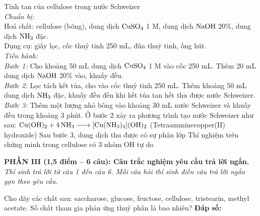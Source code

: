 \documentclass[12pt,a4paper]{article}
\providecommand{\False}{}
\begin{document}
\begin{ex}
Tính tan của cellulose trong nước Schweizer\\
\textit{Chuẩn bị:}\\
Hoá chất: cellulose (bông), dung dịch $\ce{CuSO4}$ 1 M, dung dịch $\ce{NaOH}$ 20\%, dung dịch $\ce{NH3}$ đặc.\\
Dụng cụ: giấy lọc, cốc thuỷ tinh 250 mL, đũa thuỷ tinh, ống hút.\\
\textit{Tiến hành:}\\
\textit{Bước 1:} Cho khoảng 50 mL dung dịch $\ce{CuSO4}$ 1 M vào cốc 250 mL. Thêm 20 mL dung dịch $\ce{NaOH}$ 20\% vào, khuấy đều.\\
\textit{Bước 2:} Lọc tách kết tủa, cho vào cốc thuỷ tinh 250 mL. Thêm khoảng 50 mL dung dịch $\ce{NH3}$ đặc, khuấy đều đến khi kết tủa tan hết thu được nước Schweizer.\\
\textit{Bước 3:} Thêm một lượng nhỏ bông vào khoảng 30 mL nước Schweizer và khuấy đều trong khoảng 3 phút.
{\True Ở bước 2 xảy ra phương trình tạo nước Schweizer như sau: $\ce{Cu(OH)2 + 4NH3 -> [Cu(NH3)4](OH)2}$ (Tetraamminecopper(II) hydroxide)}
{\False Sau bước 3, dung dịch thu được có sự phân lớp}
{\False Thí nghiệm trên chứng minh trong cellulose có 3 nhóm OH tự do}
\end{ex}

\vspace{0.3cm}
\noindent
\textbf{PHẦN III (1,5 điểm -- 6 câu): Câu trắc nghiệm yêu cầu trả lời ngắn.}\\
\textit{Thí sinh trả lời từ câu 1 đến câu 6. Mỗi câu hỏi thí sinh điền câu trả lời ngắn gọn theo yêu cầu.}

\setcounter{ex}{0}

\begin{ex}
Cho dãy các chất sau: saccharose, glucose, fructose, cellulose, tristearin, methyl acetate. Số chất tham gia phản ứng thuỷ phân là bao nhiêu?
\noindent\textbf{Đáp số: \color{hfRed}{4}}
\end{ex}
\end{document}
